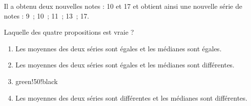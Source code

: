 	Il a obtenu deux nouvelles notes : 10 et 17 et obtient ainsi une nouvelle série de notes : 9~; 10~; 11~; 13~; 17.
	
	Laquelle des quatre propositions est vraie ?
	
	\begin{enumerate}[label=\textbf{\alph* .}]
	\item Les moyennes des deux séries sont égales et les médianes sont égales.
	\item Les moyennes des deux séries sont égales et les médianes sont différentes.
	\item \begin{color}{green!50!black}\end{color}
	\item Les moyennes des deux séries sont différentes et les médianes sont différentes.
	\end{enumerate}
